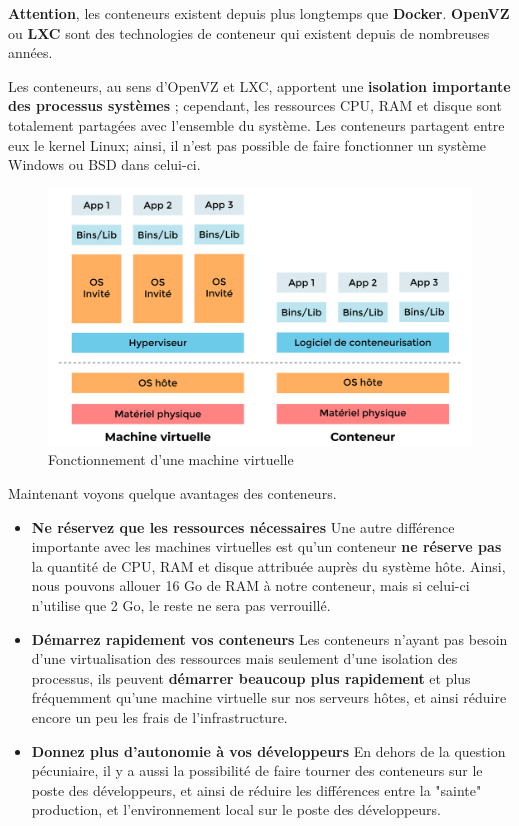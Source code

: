 \documentclass[12pt,a4paper]{article}
\begin{document}
\textbf{Attention}, les conteneurs existent depuis plus longtemps que \textbf{Docker}.
\textbf{OpenVZ} ou \textbf{LXC} sont des technologies de conteneur qui existent depuis de
nombreuses années.

Les conteneurs, au sens d'OpenVZ et LXC, apportent une \textbf{isolation importante des processus systèmes} ; cependant, les ressources CPU, RAM et disque sont totalement
partagées avec l'ensemble du système. Les conteneurs partagent entre eux le kernel Linux;
ainsi, il n'est pas possible de faire fonctionner un système Windows ou BSD dans celui-ci.

\begin{figure}
\centering
\includegraphics[scale=0.3]{img/container_vs_vm.png}
\caption{Fonctionnement d'une machine virtuelle}
\label{Tux}
\end{figure}

Maintenant voyons quelque avantages des conteneurs.
\begin{itemize}
\item \textbf{Ne réservez que les ressources nécessaires}
Une autre différence importante avec les machines virtuelles est qu'un conteneur \textbf{ne réserve pas} la quantité de CPU, RAM et disque attribuée auprès du système hôte. Ainsi, nous pouvons allouer 16 Go de RAM à notre conteneur, mais si celui-ci n'utilise que 2 Go, le reste ne sera pas verrouillé.
\item \textbf{ Démarrez rapidement vos conteneurs}
Les conteneurs n'ayant pas besoin d'une virtualisation des ressources mais seulement d'une isolation des processus, ils peuvent \textbf{démarrer beaucoup plus rapidement} et plus fréquemment qu'une machine virtuelle sur nos serveurs hôtes, et ainsi réduire encore un peu les frais de l'infrastructure.
\item \textbf{Donnez plus d'autonomie à vos développeurs}
En dehors de la question pécuniaire, il y a aussi la possibilité de faire tourner des conteneurs sur le poste des développeurs, et ainsi de réduire les différences entre la "sainte" production, et l'environnement local sur le poste des développeurs.
\end{itemize}
\end{document}

